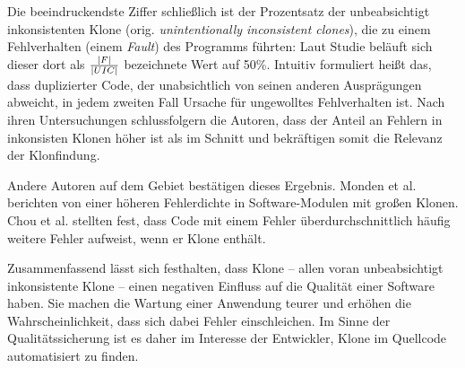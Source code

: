 Die beeindruckendste Ziffer schließlich ist der Prozentsatz der unbeabsichtigt inkonsistenten Klone (orig. \textit{unintentionally inconsistent clones}), die zu einem Fehlverhalten (einem \textit{Fault}) des Programms führten: Laut Studie beläuft sich dieser dort als $|F| \over |UIC|$ bezeichnete Wert auf 50\%. Intuitiv formuliert heißt das, dass duplizierter Code, der unabsichtlich von seinen anderen Ausprägungen abweicht, in jedem zweiten Fall Ursache für ungewolltes Fehlverhalten ist. Nach ihren Untersuchungen schlussfolgern die Autoren, dass der Anteil an Fehlern in inkonsisten Klonen höher ist als im Schnitt und bekräftigen somit die Relevanz der Klonfindung.

Andere Autoren auf dem Gebiet bestätigen dieses Ergebnis. Monden et al. \cite{monden2002software} berichten von einer höheren Fehlerdichte in Software-Modulen mit großen Klonen. Chou et al. \cite{chou2001empirical} stellten fest, dass Code mit einem Fehler überdurchschnittlich häufig weitere Fehler aufweist, wenn er Klone enthält.

Zusammenfassend lässt sich festhalten, dass Klone -- allen voran unbeabsichtigt inkonsistente Klone -- einen negativen Einfluss auf die Qualität einer Software haben. Sie machen die Wartung einer Anwendung teurer und erhöhen die Wahrscheinlichkeit, dass sich dabei Fehler einschleichen. Im Sinne der Qualitätssicherung ist es daher im Interesse der Entwickler, Klone im Quellcode automatisiert zu finden.
